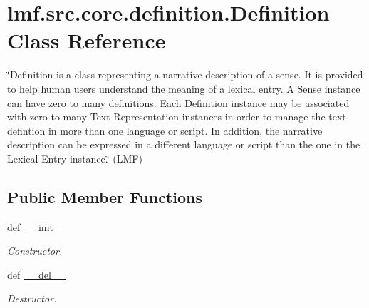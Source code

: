 \hypertarget{classlmf_1_1src_1_1core_1_1definition_1_1_definition}{\section{lmf.\+src.\+core.\+definition.\+Definition Class Reference}
\label{classlmf_1_1src_1_1core_1_1definition_1_1_definition}
}


\char`\"{}\+Definition is a class representing a narrative description of a sense. It is provided to help human users understand the meaning of a lexical entry. A Sense instance can have zero to many definitions. Each Definition instance may be associated with zero to many Text Representation instances in order to manage the text defintion in more than one language or script. In addition, the narrative description can be expressed in a different language or script than the one in the Lexical Entry instance.\char`\"{} (L\+M\+F)  


\subsection*{Public Member Functions}
\begin{DoxyCompactItemize}
\item 
def \hyperlink{classlmf_1_1src_1_1core_1_1definition_1_1_definition_a28cb2d022b2b4f699db74a6e5a904b81}{\+\_\+\+\_\+init\+\_\+\+\_\+}
\begin{DoxyCompactList}\small\item\em Constructor. \end{DoxyCompactList}\item 
def \hyperlink{classlmf_1_1src_1_1core_1_1definition_1_1_definition_a1830dd2170b25276c22d7954cd6f1b22}{\+\_\+\+\_\+del\+\_\+\+\_\+}
\begin{DoxyCompactList}\small\item\em Destructor. \end{DoxyCompactList}\end{DoxyCompactItemize}
